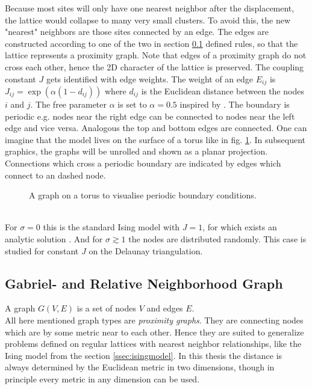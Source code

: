     Because most sites will only have one nearest neighbor after the
    displacement, the lattice would collapse to many very small clusters.
    To avoid this, the new "nearest" neighbors are those sites connected
    by an edge. The edges are constructed according to
    one of the two in section \ref{ssec:graphtypes} defined rules,
    so that the lattice represents a proximity graph. Note that edges
    of a proximity graph do not cross each other, hence the 2D character
    of the lattice is preserved. The coupling constant \(J\) gets
    identified with edge weights. The weight of an edge \(E_{ij}\) is
    \(J_{ij} = \exp (\alpha (1-d_{ij}))\) where \(d_{ij}\) is the Euclidean
    distance between the nodes \(i\) and \(j\). The free parameter
    \(\alpha\) is set to \(\alpha = 0.5\) inspired by \cite{Lima2000}.
    The boundary is periodic e.g. nodes near the right edge can be
    connected to nodes near the left edge and vice versa. Analogous the
    top and bottom edges are connected. One can imagine that the model
    lives on the surface of a torus like in fig. \ref{fig:torusRNG}.
    In subsequent graphics, the graphs will be unrolled and shown as a
    planar projection. Connections which cross a periodic boundary are
    indicated by edges which connect to an dashed node.
    \begin{figure}[htbp]
        \centering
        \caption[A Graph on a Torus to Visualise Periodic Boundary Conditions]
        {
            A graph on a torus to visualise periodic boundary conditions.
        }
        \label{fig:torusRNG}
    \end{figure}\\
    For \(\sigma = 0\) this is the standard Ising model with \(J = 1\),
    for which exists an analytic solution \cite{Onsager1944}. And for
    \(\sigma \gtrsim 1\) the nodes are distributed randomly. This case
    is studied for constant \(J\) on the Delaunay triangulation\cite{Janke1994}.\\

\subsection{Gabriel- and Relative Neighborhood Graph}
\label{ssec:graphtypes}
    A graph \(G(V,E)\) is a set of nodes \(V\) and edges \(E\).\\
    All here mentioned graph types are \emph{proximity graphs}. They are
    connecting nodes which are by some metric near to each other.
    Hence they are suited to generalize problems defined on regular
    lattices with nearest neighbor relationships, like the Ising model
    from the section \ref{ssec:isingmodel}.
    In this thesis the distance is always determined by the Euclidean
    metric in two dimensions, though in principle every metric in any
    dimension can be used.\\

